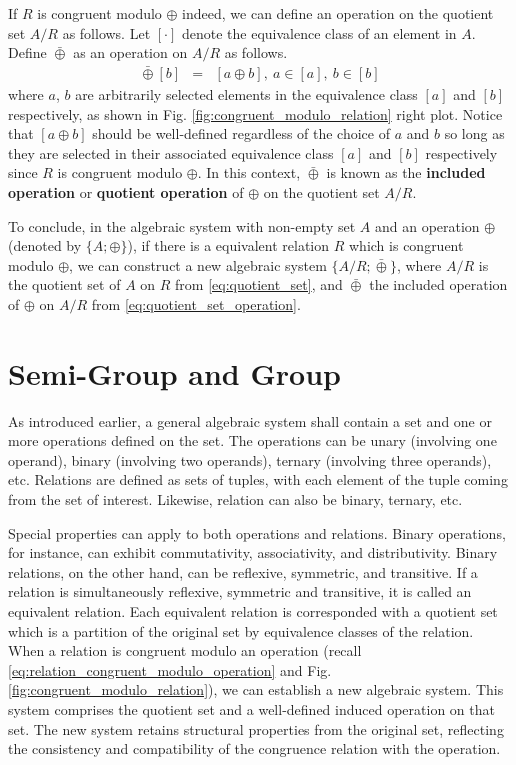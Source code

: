 If $R$ is congruent modulo $\oplus$ indeed, we can define an operation on the quotient set $A/R$ as follows. Let $[\cdot]$ denote the equivalence class of an element in $A$. Define $\bar{\oplus}$ as an operation on $A/R$ as follows.
\begin{eqnarray}
	[a] \bar{\oplus} [b] &=& [a\oplus b], ~a\in[a], ~b\in [b] \label{eq:quotient_set_operation}
\end{eqnarray}
where $a$, $b$ are arbitrarily selected elements in the equivalence class $[a]$ and $[b]$ respectively, as shown in Fig. \ref{fig:congruent_modulo_relation} right plot. Notice that $[a\oplus b]$ should be well-defined regardless of the choice of $a$ and $b$ so long as they are selected in their associated equivalence class $[a]$ and $[b]$ respectively since $R$ is congruent modulo $\oplus$. In this context, $\bar{\oplus}$ is known as the \textbf{included operation} or \textbf{quotient operation} of $\oplus$ on the quotient set $A/R$.

To conclude, in the algebraic system with non-empty set $A$ and an operation $\oplus$ (denoted by $\{A; \oplus\}$), if there is a equivalent relation $R$ which is congruent modulo $\oplus$, we can construct a new algebraic system $\{A/R; \bar{\oplus}\}$, where $A/R$ is the quotient set of $A$ on $R$ from \eqref{eq:quotient_set}, and $\bar{\oplus}$ the included operation of $\oplus$ on $A/R$ from \eqref{eq:quotient_set_operation}.

\section{Semi-Group and Group}

As introduced earlier, a general algebraic system shall contain a set and one or more operations defined on the set. The operations can be unary (involving one operand), binary (involving two operands), ternary (involving three operands), etc. Relations are defined as sets of tuples, with each element of the tuple coming from the set of interest. Likewise, relation can also be binary, ternary, etc.

Special properties can apply to both operations and relations. Binary operations, for instance, can exhibit commutativity, associativity, and distributivity. Binary relations, on the other hand, can be reflexive, symmetric, and transitive.  If a relation is simultaneously reflexive, symmetric and transitive, it is called an equivalent relation. Each equivalent relation is corresponded with a quotient set which is a partition of the original set by equivalence classes of the relation. When a relation is congruent modulo an operation (recall \eqref{eq:relation_congruent_modulo_operation} and Fig. \ref{fig:congruent_modulo_relation}), we can establish a new algebraic system. This system comprises the quotient set and a well-defined induced operation on that set. The new system retains structural properties from the original set, reflecting the consistency and compatibility of the congruence relation with the operation.


